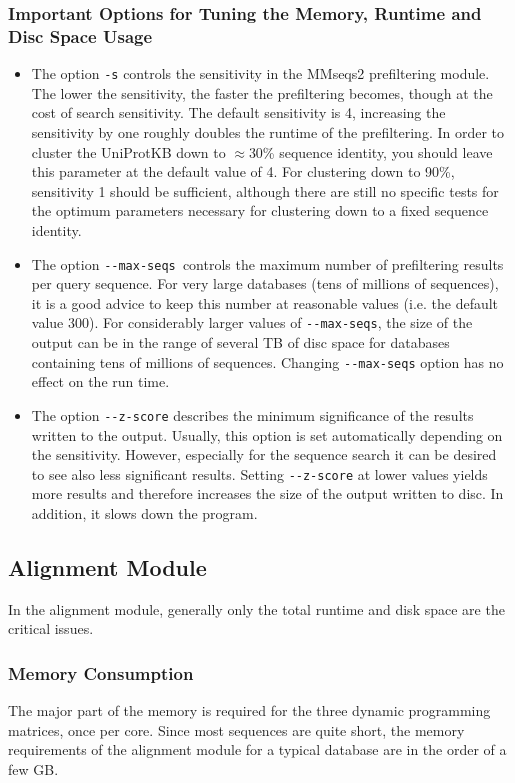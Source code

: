 \documentclass[11pt,a4paper]{scrreprt}
\begin{document}
\subsubsection{Important Options for Tuning the Memory, Runtime and Disc Space Usage}
\begin{itemize}
\item The option \texttt{-s} controls the sensitivity in the MMseqs2 prefiltering module. The lower the sensitivity, the faster the prefiltering becomes, though at the cost of search sensitivity. The default sensitivity is 4, increasing the sensitivity by one roughly doubles the runtime of the prefiltering. In order to cluster the UniProtKB down to $\approx$30\% sequence identity, you should leave this parameter at the default value of 4. For clustering down to 90\%, sensitivity 1 should be sufficient, although there are still no specific tests for the optimum parameters necessary for clustering down to a fixed sequence identity.
\item The option \texttt{-{}-max-seqs }controls the maximum number of prefiltering results per query sequence. For very large databases (tens of millions of sequences), it is a good advice to keep this number at reasonable values (i.e. the default value 300). For considerably larger values of \texttt{-{}-max-seqs}, the size of the output can be in the range of several TB of disc space for databases containing tens of millions of sequences. Changing \texttt{-{}-max-seqs} option has no effect on the run time.
\item The option \texttt{-{}-z-score} describes the minimum significance of the results written to the output. Usually, this option is set automatically depending on the sensitivity. However, especially for the sequence search it can be desired to see also less significant results. Setting \texttt{-{}-z-score} at lower values yields more results and therefore increases the size of the output written to disc. In addition, it slows down the program.
\end{itemize}
\subsection{Alignment Module}
In the alignment module, generally only the total runtime and disk space are the critical issues.
\subsubsection{Memory Consumption}
The major part of the memory is required for the three dynamic programming matrices, once per core. Since most sequences are quite short, the memory requirements of the alignment module for a typical database are in the order of a few GB. 
\end{document}
